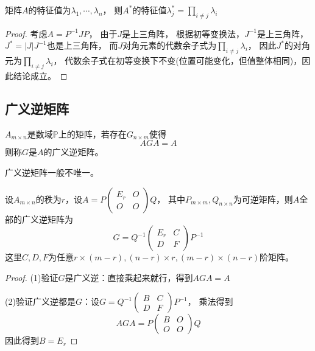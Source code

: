 \begin{theorem}[伴随矩阵的特征值]
  矩阵$A$的特征值为$\lambda_1,\cdots,\lambda_n$，
  则$A^{\ast}$的特征值$\lambda^{\ast}_j= \prod \limits_{i \neq j}\lambda_i$
\end{theorem}

\begin{proof}
  考虑$A = P^{-1}JP$，
  由于$J$是上三角阵，
  根据初等变换法，$J^{-1}$是上三角阵，
  $J^{\ast} = |J|J^{-1}$也是上三角阵，
  而$J$对角元素的代数余子式为$\prod \limits_{i \neq j}\lambda_i$，
  因此$J^{\ast}$的对角元为$\prod \limits_{i \neq j}\lambda_i$，
  代数余子式在初等变换下不变(位置可能变化，但值整体相同)，因此结论成立。
\end{proof}


\subsection{广义逆矩阵}

\begin{definition}[广义逆]
  $A_{m \times n}$是数域$\mathbb{P}$上的矩阵，若存在$G_{n \times m}$使得
  \begin{equation*}
    AGA = A
  \end{equation*}
  则称$G$是$A$的广义逆矩阵。
\end{definition}

\begin{note}
  广义逆矩阵一般不唯一。
\end{note}

\begin{theorem}[广义逆的表达式]
  设$A_{m \times n}$的秩为$r$，设$A = P \left(
    \begin{array}{cc}
      E_r&O\\
      O&O
    \end{array}
  \right)Q$，
  其中$P_{m \times m}, Q _{n \times n}$为可逆矩阵，则$A$全部的广义逆矩阵为
  \begin{equation*}
    G = Q^{-1} \left(
      \begin{array}{cc}
        E_r&C\\
        D&F
      \end{array}
    \right)P^{-1}
  \end{equation*}
  这里$C,D,F$为任意$r \times (m-r), (n-r)\times r, (m-r)\times (n-r)$阶矩阵。
\end{theorem}

\begin{proof}
  (1)验证$G$是广义逆：直接乘起来就行，得到$AGA = A$

  (2)验证广义逆都是$G$：设$G = Q^{-1} \left(
    \begin{array}{cc}
      B&C\\
      D&F
    \end{array}
  \right)P^{-1}$，
  乘法得到
  \begin{equation*}
    AGA = P \left(
      \begin{array}{cc}
        B&O\\
        O&O
      \end{array}
    \right)Q
  \end{equation*}
  因此得到$B = E_r$
\end{proof}

